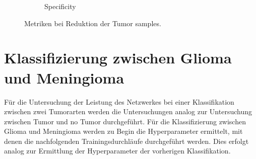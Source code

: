 \begin{figure}[H]
\begin{subfigure}[b]{0.48\textwidth}
    \caption{Specificity}
    \label{fig:reduzierung_tu_specificity}
  \end{subfigure}
  \caption{Metriken bei Reduktion der Tumor samples.}
  \label{fig:reduzierung_tumorsamples}
\end{figure}
\begin{table}[H]
    \centering
    \caption{Mittelwert und Standardabweichung der Metriken bei der Reduzierung der Tumor Klasse.}
    \label{tab:red_tu}
\end{table}

\section{Klassifizierung zwischen Glioma und Meningioma}
Für die Untersuchung der Leistung des Netzwerkes bei einer Klassifikation zwischen zwei Tumorarten werden die Untersuchungen analog zur Untersuchung 
zwischen Tumor und no Tumor durchgeführt.
Für die Klassifizierung zwischen Glioma und Meningioma werden zu Begin die Hyperparameter ermittelt, mit denen die nachfolgenden
Trainingsdurchläufe durchgeführt werden. 
Dies erfolgt analog zur Ermittlung der Hyperparameter der vorherigen Klassifikation.
